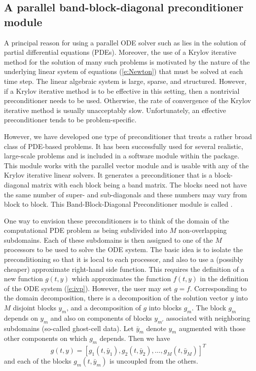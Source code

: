 \subsection{A parallel band-block-diagonal preconditioner module}
\label{sss:cvbbdpre}

A principal reason for using a parallel ODE solver such as {\cvode} lies
in the solution of partial differential equations (PDEs).  Moreover,
the use of a Krylov iterative method for the solution of many such
problems is motivated by the nature of the underlying linear system of
equations (\ref{e:Newton}) that must be solved at each time step.  The
linear algebraic system is large, sparse, and structured. However, if
a Krylov iterative method is to be effective in this setting, then a
nontrivial preconditioner needs to be used.  Otherwise, the rate of
convergence of the Krylov iterative method is usually unacceptably
slow.  Unfortunately, an effective preconditioner tends to be
problem-specific.

However, we have developed one type of preconditioner that treats a
rather broad class of PDE-based problems.  It has been successfully
used for several realistic, large-scale problems \cite{HiTa:98} and is
included in a software module within the {\cvode} package. This module
works with the parallel vector module {\nvecp} and is usable with any of
the Krylov iterative linear solvers.  It generates a preconditioner
that is a block-diagonal matrix with each block being a band matrix.
The blocks need not have the same number of super- and sub-diagonals
and these numbers may vary from block to block. This Band-Block-Diagonal
Preconditioner module is called {\cvbbdpre}.

One way to envision these preconditioners is to think of the domain of
the computational PDE problem as being subdivided into $M$ non-overlapping
subdomains.  Each of these subdomains is then assigned to one of the
$M$ processors to be used to solve the ODE system. The basic idea is
to isolate the preconditioning so that it is local to each processor,
and also to use a (possibly cheaper) approximate right-hand side
function. This requires the definition of a new function $g(t,y)$
which approximates the function $f(t, y)$ in the definition of the ODE
system (\ref{e:ivp}). However, the user may set $g = f$.  Corresponding
to the domain decomposition, there is a decomposition of the solution
vector $y$ into $M$ disjoint blocks $y_m$, and a decomposition of $g$
into blocks $g_m$.  The block $g_m$ depends on $y_m$ and also on
components of blocks $y_{m'}$ associated with neighboring subdomains
(so-called ghost-cell data).  Let $\bar{y}_m$ denote $y_m$ augmented
with those other components on which $g_m$ depends.  Then we have
\begin{equation}
  g(t,y) = [g_1(t,\bar{y}_1), g_2(t,\bar{y}_2), \ldots, g_M(t,\bar{y}_M)]^T
\end{equation}
and each of the blocks $g_m(t, \bar{y}_m)$ is uncoupled from the others.

